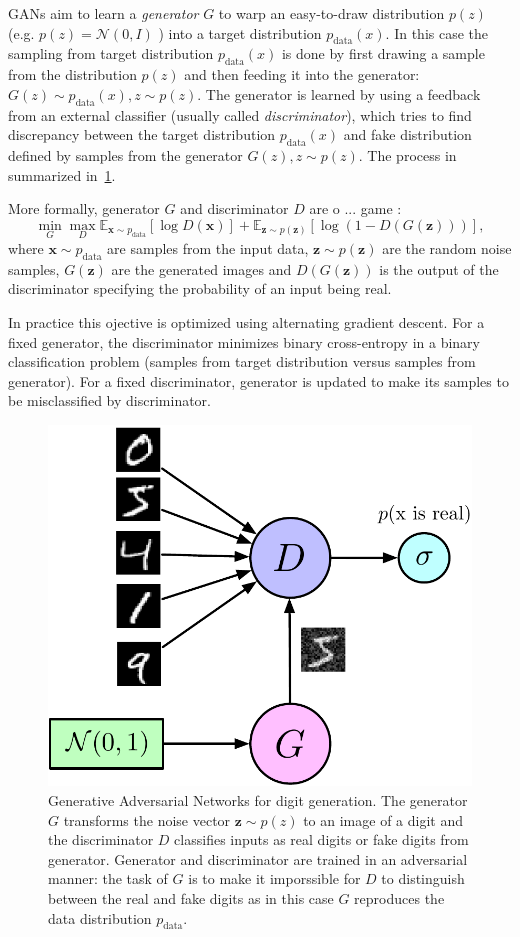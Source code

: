 \documentclass{webofc}
\newcommand{\vx}{\ensuremath{\mathbf{x}}}
\newcommand{\vz}{\ensuremath{\mathbf{z}}}
\newcommand{\pdata}{\ensuremath{p_{\text{data}}}}
\begin{document}
GANs aim to learn a \textit{generator} $G$ to warp an easy-to-draw distribution $p(z)$ (e.g. $p(z) = \mathcal{N}(0, I)$ ) into a target distribution $\pdata(x)$. In this case the sampling from target distribution $\pdata(x)$ is done by first drawing a sample from the distribution $p(z)$ and then feeding it into the generator: $G(z) \sim \pdata(x), z\sim p(z)$. The generator is learned by using a feedback from an external classifier (usually called \textit{discriminator}), which tries to find discrepancy between the target distribution $\pdata(x)$ and fake distribution defined by samples from the generator $G(z), z\sim p(z)$. The process in summarized in~\cref{fig:GANs}.

More formally, generator $G$ and discriminator $D$ are o ... game : 
\begin{equation}\label{eq:gan}
\min_G \max_D \mathbb{E}_{\vx \sim \pdata} [\log D(\vx)] + \mathbb{E}_{\vz \sim p(\vz)} [\log(1 - D(G(\vz)))],
\end{equation} 
where $\vx \sim \pdata$ are samples from the input data, $\vz \sim p(\vz)$ are the random noise samples, $G(\vz)$ are the generated images and $D(G(\vz))$ is the output of the discriminator specifying the probability of an input being real.

In practice this ojective is optimized using alternating gradient descent. For a fixed generator, the discriminator minimizes binary cross-entropy in a binary classification problem (samples from target distribution versus samples from generator). For a fixed discriminator, generator is updated to make its samples to be misclassified by discriminator.   


\begin{figure}
\centering
\includegraphics[width=0.3\linewidth]{figures/gan_pic.pdf}
\caption{Generative Adversarial Networks for digit generation. The generator $G$ transforms the noise vector $\vz \sim p(z)$ to an image of a digit and the discriminator $D$ classifies inputs as real digits or fake digits from generator. Generator and discriminator are trained in an adversarial manner: the task of $G$ is to make it imporssible for $D$ to distinguish between the real and fake digits as in this case $G$ reproduces the data distribution $\pdata$.}
\label{fig:GANs}
\end{figure}
\end{document}
